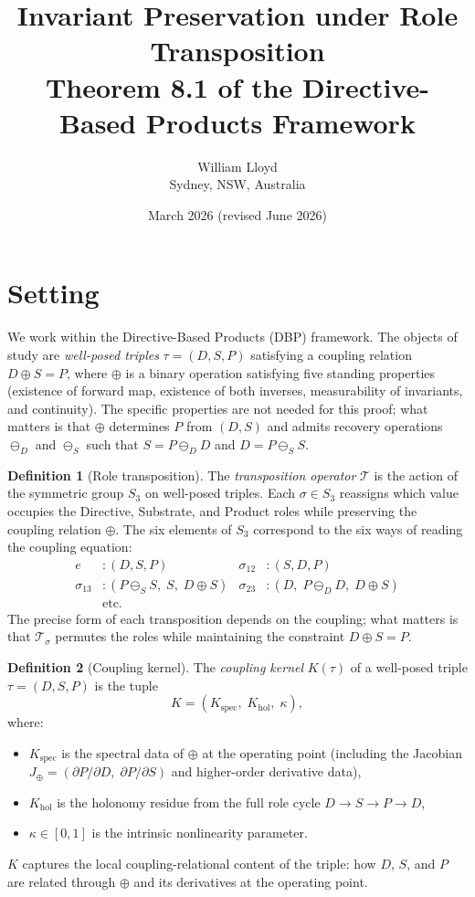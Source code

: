 \documentclass[12pt,a4paper]{article}
\title{\textbf{Invariant Preservation under Role Transposition}\\[0.4em]
\large Theorem 8.1 of the Directive-Based Products Framework}
\author{William Lloyd\\
\small Sydney, NSW, Australia}
\date{March 2026 \quad\textnormal{\small (revised June 2026)}}
\theoremstyle{definition}
\newtheorem{definition}{Definition}
\theoremstyle{plain}
\theoremstyle{remark}
\newcommand{\T}{\mathcal{T}}
\begin{document}
\maketitle

\section{Setting}

We work within the Directive-Based Products (DBP) framework. The objects of study are \emph{well-posed triples} $\tau = (D, S, P)$ satisfying a coupling relation $D \oplus S = P$, where $\oplus$ is a binary operation satisfying five standing properties (existence of forward map, existence of both inverses, measurability of invariants, and continuity). The specific properties are not needed for this proof; what matters is that $\oplus$ determines $P$ from $(D,S)$ and admits recovery operations $\ominus_D$ and $\ominus_S$ such that $S = P \ominus_D D$ and $D = P \ominus_S S$.

\begin{definition}[Role transposition]\label{def:rt}
The \emph{transposition operator} $\T$ is the action of the symmetric group $S_3$ on well-posed triples. Each $\sigma \in S_3$ reassigns which value occupies the Directive, Substrate, and Product roles while preserving the coupling relation $\oplus$. The six elements of $S_3$ correspond to the six ways of reading the coupling equation:
\begin{align*}
e &: (D, S, P) & \sigma_{12} &: (S, D, P) \\
\sigma_{13} &: (P \ominus_S S,\; S,\; D \oplus S) & \sigma_{23} &: (D,\; P \ominus_D D,\; D \oplus S) \\
& \text{etc.}
\end{align*}
The precise form of each transposition depends on the coupling; what matters is that $\T_\sigma$ permutes the roles while maintaining the constraint $D \oplus S = P$.
\end{definition}

\begin{definition}[Coupling kernel]\label{def:kernel}
The \emph{coupling kernel} $K(\tau)$ of a well-posed triple $\tau = (D, S, P)$ is the tuple
\[
K = (K_{\mathrm{spec}},\; K_{\mathrm{hol}},\; \kappa),
\]
where:
\begin{itemize}[nosep]
\item $K_{\mathrm{spec}}$ is the spectral data of $\oplus$ at the operating point (including the Jacobian $J_\oplus = (\partial P/\partial D,\; \partial P/\partial S)$ and higher-order derivative data),
\item $K_{\mathrm{hol}}$ is the holonomy residue from the full role cycle $D \to S \to P \to D$,
\item $\kappa \in [0,1]$ is the intrinsic nonlinearity parameter.
\end{itemize}
$K$ captures the local coupling-relational content of the triple: how $D$, $S$, and $P$ are related through $\oplus$ and its derivatives at the operating point.
\end{definition}
\end{document}
